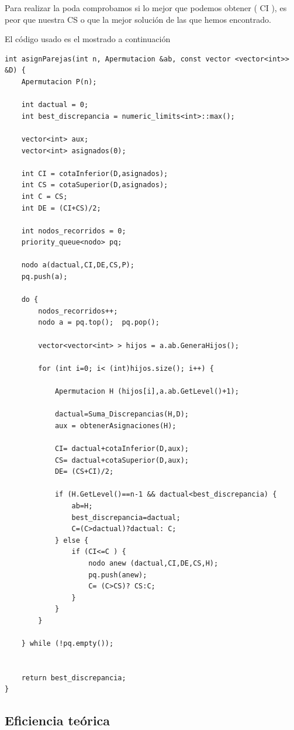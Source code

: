 Para realizar la poda comprobamos si lo mejor que podemos obtener ( CI ), es peor que nuestra CS o que la mejor solución de las que hemos encontrado.\newline



El código usado es el mostrado a continuación

\begin{lstlisting}
int asignParejas(int n, Apermutacion &ab, const vector <vector<int>> &D) {
    Apermutacion P(n);

    int dactual = 0;
    int best_discrepancia = numeric_limits<int>::max();

    vector<int> aux;
    vector<int> asignados(0);

    int CI = cotaInferior(D,asignados);
    int CS = cotaSuperior(D,asignados);
    int C = CS;
    int DE = (CI+CS)/2;

    int nodos_recorridos = 0;
    priority_queue<nodo> pq;

    nodo a(dactual,CI,DE,CS,P);
    pq.push(a);

    do {
        nodos_recorridos++;
        nodo a = pq.top();  pq.pop();

        vector<vector<int> > hijos = a.ab.GeneraHijos();

        for (int i=0; i< (int)hijos.size(); i++) {

            Apermutacion H (hijos[i],a.ab.GetLevel()+1);

            dactual=Suma_Discrepancias(H,D);
            aux = obtenerAsignaciones(H);

            CI= dactual+cotaInferior(D,aux);
            CS= dactual+cotaSuperior(D,aux);
            DE= (CS+CI)/2;

            if (H.GetLevel()==n-1 && dactual<best_discrepancia) {
                ab=H;
                best_discrepancia=dactual;
                C=(C>dactual)?dactual: C;
            } else {
                if (CI<=C ) {
                    nodo anew (dactual,CI,DE,CS,H);
                    pq.push(anew);
                    C= (C>CS)? CS:C;
                }
            }
        }

    } while (!pq.empty());


    return best_discrepancia;
}
\end{lstlisting}

\subsection{Eficiencia teórica}

